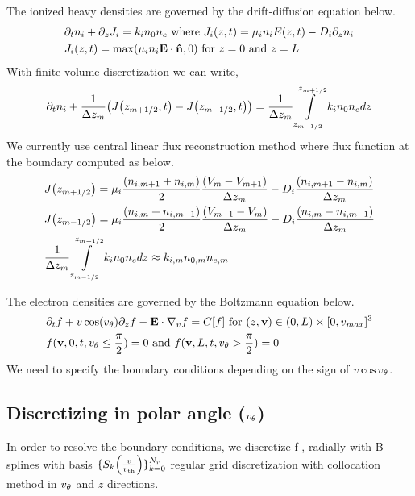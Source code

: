 \documentclass{article}[draft]
\begin{document}
\par The ionized heavy densities are governed by the drift-diffusion equation below.
\begin{align*}
	&\partial_t n_i + \partial_z J_i = k_i n_0 n_e \text{ where } J_i\of{z, t} = \mu_i n_i E\of{z,t} -D_i \partial_z n_i\\
	&J_i(z,t)=\max\of{\mu_i n_i \vect{E}\cdot \vect{\hat{n}},0} \text{ for } z =0 \text{ and } z=L
\end{align*} With finite volume discretization we can write, 
\begin{align}
	\partial_t n_i + \frac{1}{\Delta z_m} \of{J\of{z_{m+1/2},t} - J\of{z_{m-1/2},t}} = \frac{1}{\Delta z_m}  \myint_{z_{m-1/2}}^{z_{m+1/2}} k_i n_0 n_e dz
\end{align} We currently use central linear flux reconstruction method where flux function at the boundary computed as below. 
\begin{align*}
&J\of{z_{m+1/2}} = \mu_i \frac{\of{n_{i,m+1} + n_{i,m}}}{2} \frac{\of{V_m-V_{m+1}}}{\Delta z_m} - D_i \frac{\of{n_{i, m+1} -n_{i, m}}}{\Delta z_m} \\
&J\of{z_{m-1/2}} = \mu_i \frac{\of{n_{i,m} + n_{i,m-1}}}{2} \frac{\of{V_{m-1}-V_{m}}}{\Delta z_m} - D_i \frac{\of{n_{i, m} -n_{i, m-1}}}{\Delta z_m} \\
&\frac{1}{\Delta z_m}  \myint_{z_{m-1/2}}^{z_{m+1/2}}  k_i n_0 n_e dz \approx k_{i,m} n_{0,m} n_{e,m} 
\end{align*}

The electron densities are governed by the Boltzmann equation below. 
\begin{align*}
&	\partial_t f + v\cos\of{\vtheta} \partial_z f -\vect{E}\cdot\nabla_v f = C[f] \text{ for } (z,\vect{v}) \in (0,L) \times[0,v_{max}]^3 \\
& f(\vect{v}, 0, t, \vtheta \leq \frac{\pi}{2})	= 0 \text{ and } f(\vect{v}, L, t, \vtheta > \frac{\pi}{2})	= 0
\end{align*}
We need to specify the boundary conditions depending on the sign of $v \cos{v_{\theta}}$.

\subsection{Discretizing in polar angle (${v_{\theta}}$)}
In order to resolve the boundary conditions, we discretize f , radially with B-splines with basis $\{S_k\of{\frac{v}{\vth}}\}_{k=0}^{N_r}$ regular grid discretization with collocation method in ${v_{\theta}}$ and $z$ directions. 
\end{document}
